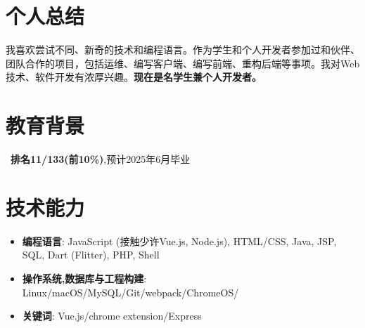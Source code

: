 \documentclass{resume}
\begin{document}


\section{个人总结}
我喜欢尝试不同、新奇的技术和编程语言。作为学生和个人开发者参加过和伙伴、团队合作的项目，包括运维、编写客户端、编写前端、重构后端等事项。我对Web技术、软件开发有浓厚兴趣。\textbf{现在是名学生兼个人开发者。}

\section{教育背景}
\ \textbf{排名11/133(前10\%)},预计2025年6月毕业

\section{技术能力}
\begin{itemize}[parsep=0.2ex]
  \item \textbf{编程语言}: JavaScript (接触少许Vue.js, Node.js), HTML/CSS, Java, JSP, SQL, Dart (Flitter), PHP, Shell
  \item \textbf{操作系统,数据库与工程构建}: Linux/macOS/MySQL/Git/webpack/ChromeOS/
  \item \textbf{关键词}: Vue.js/chrome extension/Express
\end{itemize}
\end{document}
